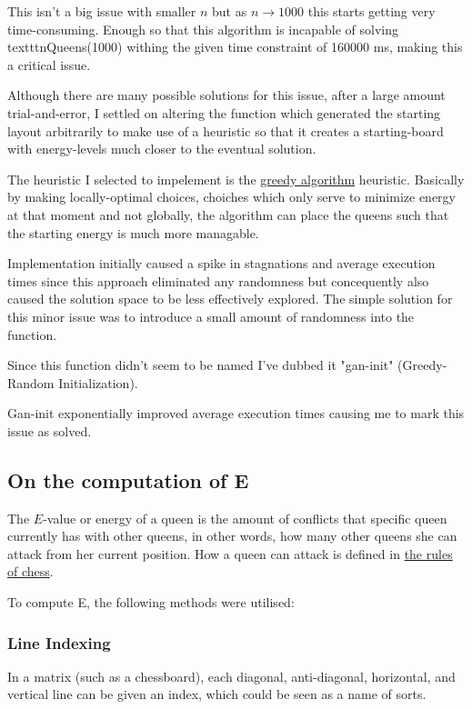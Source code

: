 \documentclass{article}
\begin{document}
This isn't a big issue with smaller $n$ but as $n \to 1000$ this starts getting very time-consuming.
Enough so that this algorithm is incapable of solving texttt{nQueens(1000)} withing the given time constraint of 160000 ms, making this a critical issue.

Although there are many possible solutions for this issue, after a large amount trial-and-error,
I settled on altering the function which generated the starting layout arbitrarily to make use of a heuristic so that it creates
a starting-board with energy-levels much closer to the eventual solution.

The heuristic I selected to impelement is the \href{https://en.wikipedia.org/wiki/Greedy_algorithm}{greedy algorithm} heuristic.
Basically by making locally-optimal choices, choiches which only serve to minimize energy at that moment and not globally,
the algorithm can place the queens such that the starting energy is much more managable.

Implementation initially caused a spike in stagnations and average execution times since this approach eliminated any randomness
but concequently also caused the solution space to be less effectively explored. The simple solution for this minor issue was to introduce a small amount of randomness
into the function.

Since this function didn't seem to be named I've dubbed it "gan-init" (Greedy-Random Initialization).

Gan-init exponentially improved average execution times causing me to mark this issue as solved.

\subsection{On the computation of E}
The $E$-value or energy of a queen is the amount of conflicts that specific queen currently has with other queens, in other words,
how many other queens she can attack from her current position. How a queen can attack is defined in
\href{https://en.wikipedia.org/wiki/Queen_(chess)\#Placement\_and\_movement}{the rules of chess}.

To compute E, the following methods were utilised:

\subsubsection{Line Indexing}
In a matrix (such as a chessboard), each diagonal, anti-diagonal, horizontal, and vertical line can be given an index, which could be seen as a name of sorts.
\end{document}

